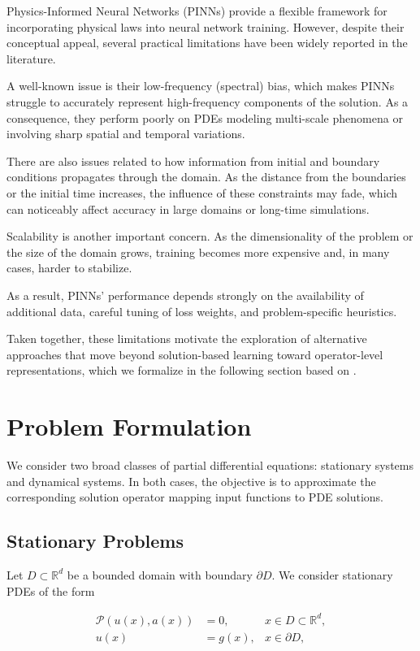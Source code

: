 \documentclass[final,1p,times]{elsarticle}
\theoremstyle{definition}
\newcommand{\R}{\mathbb{R}}
\renewcommand{\P}{\mathcal{P}}
\begin{document}
Physics-Informed Neural Networks (PINNs) provide a flexible framework for incorporating physical laws into neural network training. However, despite their conceptual appeal, several practical limitations have been widely reported in the literature.

A well-known issue is their low-frequency (spectral) bias, which makes PINNs struggle to accurately represent high-frequency components of the solution. As a consequence, they perform poorly on PDEs modeling multi-scale phenomena or involving sharp spatial and temporal variations.

There are also issues related to how information from initial and boundary conditions propagates through the domain. As the distance from the boundaries or the initial time increases, the influence of these constraints may fade, which can noticeably affect accuracy in large domains or long-time simulations.

Scalability is another important concern. As the dimensionality of the problem or the size of the domain grows, training becomes more expensive and, in many cases, harder to stabilize. 

As a result, PINNs' performance depends strongly on the availability of additional data, careful tuning of loss weights, and problem-specific heuristics.

Taken together, these limitations motivate the exploration of alternative approaches that move beyond solution-based learning toward operator-level representations, which we formalize in the following section based on \cite{Pino_Li}.


\section{Problem Formulation}

We consider two broad classes of partial differential equations: stationary systems and dynamical systems. In both cases, the objective is to approximate the corresponding solution operator mapping input functions to PDE solutions.

\subsection{Stationary Problems}

Let $D \subset \R^d$ be a bounded domain with boundary $\partial D$. We consider stationary PDEs of the form

\begin{equation}\label{eq:stationary_pde}
\begin{aligned}
\P(u(x),a(x)) &= 0,  &x \in D\subset\R^d,\\
u(x) &= g(x), &x \in \partial D,
\end{aligned}
\end{equation}
\end{document}
